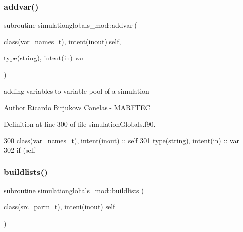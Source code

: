 \subsubsection{\texorpdfstring{addvar()}{addvar()}}
{\footnotesize\ttfamily subroutine simulationglobals\+\_\+mod\+::addvar (\begin{DoxyParamCaption}\item[{class(\mbox{\hyperlink{structsimulationglobals__mod_1_1var__names__t}{var\+\_\+names\+\_\+t}}), intent(inout)}]{self,  }\item[{type(string), intent(in)}]{var }\end{DoxyParamCaption})\hspace{0.3cm}{\ttfamily [private]}}



adding variables to variable pool of a simulation 

\begin{DoxyAuthor}{Author}
Ricardo Birjukovs Canelas -\/ M\+A\+R\+E\+T\+EC 
\end{DoxyAuthor}


Definition at line 300 of file simulation\+Globals.\+f90.


\begin{DoxyCode}
300     \textcolor{keywordtype}{class}(var\_names\_t), \textcolor{keywordtype}{intent(inout)} :: self
301     \textcolor{keywordtype}{type}(string), \textcolor{keywordtype}{intent(in)} :: var
302     \textcolor{keywordflow}{if} (self%
\end{DoxyCode}
\mbox{\label{namespacesimulationglobals__mod_a20a4476e2a8dbec4c1aaa202a14b4a40}} 
\subsubsection{\texorpdfstring{buildlists()}{buildlists()}}
{\footnotesize\ttfamily subroutine simulationglobals\+\_\+mod\+::buildlists (\begin{DoxyParamCaption}\item[{class(\mbox{\hyperlink{structsimulationglobals__mod_1_1src__parm__t}{src\+\_\+parm\+\_\+t}}), intent(inout)}]{self }\end{DoxyParamCaption})\hspace{0.3cm}{\ttfamily [private]}}



